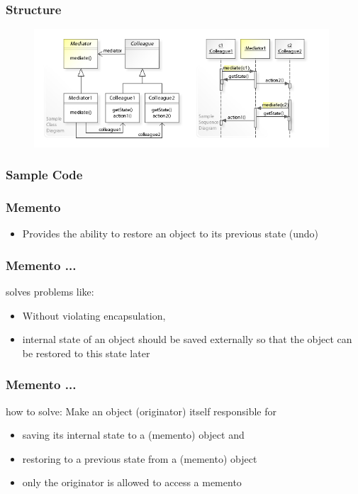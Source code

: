 \documentclass{beamer}
\begin{document}
\begin{frame}[fragile]
\frametitle{Structure}

 \begin{figure}[ht]
       \includegraphics[width=11cm]{./images/mediator.jpg}
 \end{figure}

\end{frame}


\begin{frame}[fragile]
\frametitle{Sample Code}
    
\end{frame}



\begin{frame}[fragile]
\frametitle{Memento}

\begin{itemize}
\item Provides the ability to restore an object to its previous state (undo)

\end{itemize}

\end{frame}


\begin{frame}[fragile]
\frametitle{Memento ...}

\begin{block}{solves problems like:}
    \begin{itemize}
        \item Without violating encapsulation,
        \item internal state of an object should be saved externally so that the object can be restored to this state later
    \end{itemize}
\end{block}

\end{frame}

\begin{frame}[fragile]
\frametitle{Memento ...}

\begin{block}{how to solve:}
Make an object (originator) itself responsible for
    \begin{itemize}
    \item saving its internal state to a (memento) object and
    \item restoring to a previous state from a (memento) object
    \item only the originator is allowed to access a memento 
    \end{itemize}
\end{block}

\end{frame}
\end{document}
